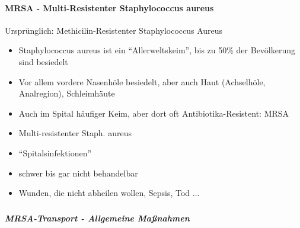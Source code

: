 \documentclass{article}
\newcommand\gZ[1]{\textcolor[rgb]{0.5019608,0.5019608,0.5019608}{#1}}
\begin{document}
\paragraph[MRSA - Multi-Resistenter Staphylococcus aureus]{MRSA -
Multi-Resistenter Staphylococcus aureus}
{\mdseries
\gZ{Urspr\"unglich: Methicilin-Resistenter
Staphylococcus Aureus}}

\begin{itemize}
\item {\mdseries
Staphylococcus aureus ist ein
{\textquotedblleft}Allerweltskeim{\textquotedblright}, bis zu 50\% der
Bev\"olkerung sind besiedelt}

\item {\mdseries
Vor allem vordere Nasenh\"ole besiedelt, aber auch Haut (Achselh\"ole,
Analregion), Schleimh\"aute}

\item {\mdseries
Auch im Spital h\"aufiger Keim, aber dort oft Antibiotika-Resistent:
MRSA}

\end{itemize}
\begin{itemize}
\item {\mdseries
Multi-resistenter Staph. aureus}

\item {\mdseries
{\textquotedblleft}Spitalsinfektionen{\textquotedblright}}

\item {\mdseries
schwer bis gar nicht behandelbar}

\item {\mdseries
Wunden, die nicht abheilen wollen, Sepsis, Tod ...}

\end{itemize}
\subparagraph{}
\subparagraph[MRSA-Transport - Allgemeine Ma{\ss}nahmen]{MRSA-Transport
- Allgemeine Ma{\ss}nahmen}
\end{document}
